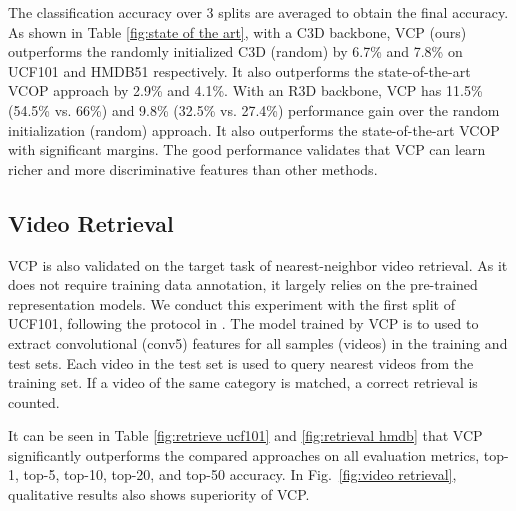 \documentclass[letterpaper]{article}
\begin{document}
The classification accuracy over 3 splits are averaged to obtain the final accuracy.
As shown in Table \ref{fig:state of the art}, with a C3D backbone, VCP (ours) outperforms the randomly initialized C3D (random) by 6.7\% and 7.8\% on UCF101 and HMDB51 respectively. 
It also outperforms the state-of-the-art VCOP approach \cite{xu2019self} by 2.9\% and 4.1\%. 
With an R3D backbone, VCP has 11.5\% (54.5\% vs. 66\%) and 9.8\% (32.5\% vs. 27.4\%) performance gain over the random initialization (random) approach. It also outperforms the state-of-the-art VCOP \cite{xu2019self} with significant margins. The good performance validates that VCP can learn richer and more discriminative features than other methods.


\subsection{Video Retrieval}

VCP is also validated on the target task of nearest-neighbor video retrieval. As it does not require training data annotation, it largely relies on the pre-trained representation models. 
We conduct this experiment with the first split of UCF101, following the protocol in \cite{xu2019self}.
The model trained by VCP is to used to extract convolutional (conv5) features for all samples (videos) in the training and test sets. Each video in the test set is used to query   nearest videos from the training set. If a video of the same category is matched, a correct retrieval is counted.

It can be seen in Table \ref{fig:retrieve ucf101} and \ref{fig:retrieval hmdb} that 
VCP significantly outperforms the compared approaches on all evaluation metrics,  top-1, top-5, top-10, top-20, and top-50 accuracy. In Fig.\ \ref{fig:video retrieval}, qualitative results also shows superiority of VCP.
\end{document}
